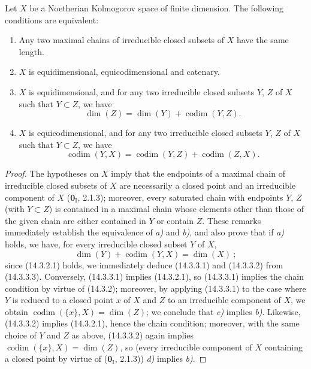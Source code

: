 \begin{proposition}[14.3.3]
\label{0.14.3.3}
Let $X$ be a Noetherian Kolmogorov space of finite dimension. The
following conditions are equivalent:
\begin{enumerate}
  \item[\textup{a)}] Any two maximal chains of irreducible closed subsets of $X$
  have the same length.
  \item[\textup{b)}] $X$ is equidimensional, equicodimensional and catenary.
  \item[\textup{c)}] $X$ is equidimensional, and for any two irreducible closed
  subsets $Y$, $Z$ of $X$ such that $Y\subset Z$, we have
  \[
    \dim(Z)=\dim(Y)+\operatorname{codim}(Y,Z).
    \tag{14.3.3.1}\label{0.14.3.3.1}
  \]
  \item[\textup{d)}] $X$ is equicodimensional, and for any two irreducible closed
  subsets $Y$, $Z$ of $X$ such that $Y\subset Z$, we have
  \[
    \operatorname{codim}(Y,X)=
    \operatorname{codim}(Y,Z)+\operatorname{codim}(Z,X).
    \tag{14.3.3.2}\label{0.14.3.3.2}
  \]
\end{enumerate}
\end{proposition}

\begin{proof}
The hypotheses on $X$ imply that the endpoints of a maximal chain of
irreducible closed subsets of $X$ are necessarily a closed point and
an irreducible component of $X$ ($\mathbf{0}_{\mathrm I}$, 2.1.3); moreover, every
saturated chain with endpoints $Y$, $Z$ (with $Y\subset Z$) is contained in a
maximal chain whose elements other than those of the given chain are
either contained in $Y$ or contain $Z$. These remarks
immediately establish the equivalence of \emph{a)} and \emph{b)}, and also prove that if \emph{a)}
holds, we have, for every irreducible closed subset $Y$ of $X$,
\[
  \dim(Y)+\operatorname{codim}(Y,X)=\dim(X)~;
  \tag{14.3.3.3}\label{0.14.3.3.3}
\]
since (14.3.2.1) holds, we immediately deduce (14.3.3.1) and (14.3.3.2) from
(14.3.3.3). Conversely, (14.3.3.1) implies (14.3.2.1), so (14.3.3.1)
implies the chain condition by virtue of (14.3.2); moreover, by
applying (14.3.3.1) to the case where $Y$ is reduced to a closed point $x$ of $X$ and
$Z$ to an irreducible component of $X$, we obtain
$\operatorname{codim}(\{x\},X)=\dim(Z)$; we conclude that \emph{c)} implies \emph{b)}.
Likewise, (14.3.3.2) implies (14.3.2.1), hence the chain condition;
moreover, with the same choice of $Y$ and $Z$ as above, (14.3.3.2) again
implies $\operatorname{codim}(\{x\},X)=\dim(Z)$, so (every irreducible
component of $X$ containing a closed point by virtue of ($\mathbf{0}_{\mathrm I}$,
2.1.3)) \emph{d)} implies \emph{b)}.
\end{proof}

